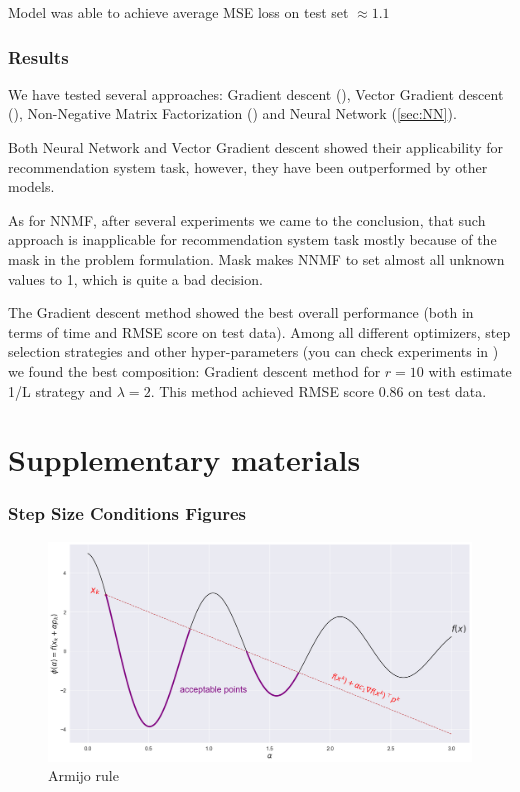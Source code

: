 \documentclass{article}
\begin{document}
Model was able to achieve average MSE loss on test set $\approx 1.1$

\section{Results}
We have tested several approaches: Gradient descent (), Vector Gradient descent (), Non-Negative Matrix Factorization () and Neural Network (\cref{sec:NN}).

Both Neural Network and Vector Gradient descent showed their applicability for recommendation system task, however, they have been outperformed by other models.

As for NNMF, after several experiments we came to the conclusion, that such approach is inapplicable for recommendation system task mostly because of the mask in the problem formulation. Mask makes NNMF to set almost all unknown values to 1, which is quite a bad decision.

The Gradient descent method showed the best overall performance (both in terms of time and RMSE score on test data). Among all different optimizers, step selection strategies and other hyper-parameters (you can check experiments in ) we found the best composition: Gradient descent method for $r=10$ with estimate 1/L strategy and $\lambda=2$. This method achieved RMSE score 0.86 on test data.





\clearpage
\appendix

\part*{Supplementary materials}

\section{Step Size Conditions Figures}

\begin{figure}[H]
  \centering
  \includegraphics[width=\textwidth,keepaspectratio]{../data/armijo.png}
  \caption[Armijo rule]{Armijo rule}\label{fig:armijo}
\end{figure}
\end{document}
